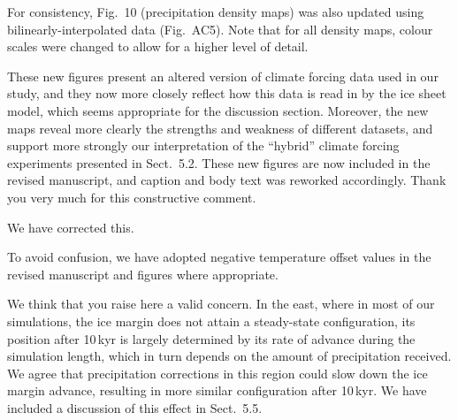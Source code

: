 \documentclass[10pt]{article}
\begin{document}
For consistency, Fig.~10 (precipitation density maps) was also updated using bilinearly-interpolated data (Fig.~AC5). Note that for all density maps, colour scales were changed to allow for a higher level of detail.

These new figures present an altered version of climate forcing data used in our study, and they now more closely reflect how this data is read in by the ice sheet model, which seems appropriate for the discussion section. Moreover, the new maps reveal more clearly the strengths and weakness of different datasets, and support more strongly our interpretation of the ``hybrid'' climate forcing experiments presented in Sect.~5.2. These new figures are now included in the revised manuscript, and caption and body text was reworked accordingly. Thank you very much for this constructive comment.


We have corrected this.


To avoid confusion, we have adopted negative temperature offset values in the revised manuscript and figures where appropriate.


We think that you raise here a valid concern. In the east, where in most of our simulations, the ice margin does not attain a steady-state configuration, its position after 10\,kyr is largely determined by its rate of advance during the simulation length, which in turn depends on the amount of precipitation received. We agree that precipitation corrections in this region could slow down the ice margin advance, resulting in more similar configuration after 10\,kyr. We have included a discussion of this effect in Sect.~5.5.
\end{document}
